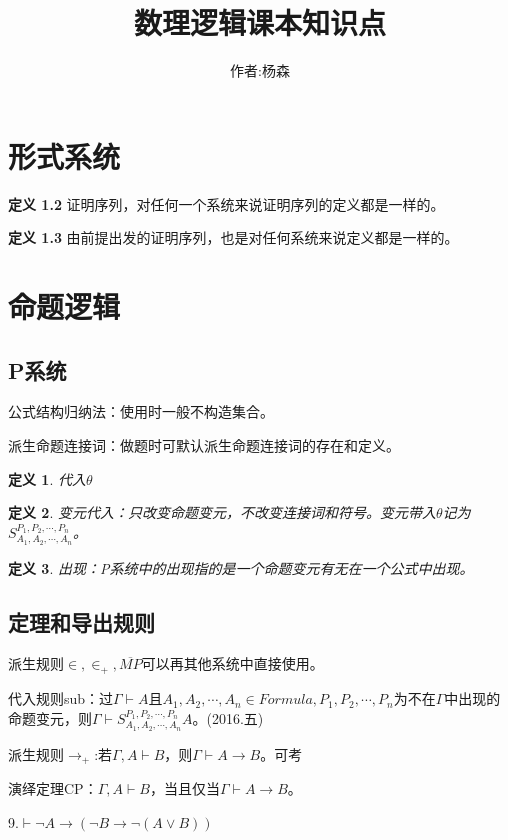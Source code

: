 \documentclass[a4paper]{ctexart}
\newtheorem{defi}{\hspace{2em}定义}[subsection]
\begin{document}
\title{数理逻辑课本知识点}
\author{作者:杨森}
\maketitle
\newpage

\section{形式系统}

\textbf{定义 1.2} 证明序列，对任何一个系统来说证明序列的定义都是一样的。

\textbf{定义 1.3} 由前提出发的证明序列，也是对任何系统来说定义都是一样的。 

\section{命题逻辑}
\subsection{P系统}
公式结构归纳法：使用时一般不构造集合。

派生命题连接词：做题时可默认派生命题连接词的存在和定义。
\begin{defi}
  代入$\theta$
\end{defi}
\begin{defi}
  变元代入：只改变命题变元，不改变连接词和符号。变元带入$\theta$记为$S_{A_1,A_2,\cdots,A_n}^{P_1,P_2,\cdots,P_n}$。
\end{defi}
\begin{defi}
  出现：P系统中的出现指的是一个命题变元有无在一个公式中出现。
\end{defi}

\subsection{定理和导出规则}
派生规则$\in,\in_{+},\overline{MP}$可以再其他系统中直接使用。

代入规则sub：过$\Gamma\vdash A$且$A_1,A_2,\cdots,A_n\in Formula,P_1,P_2,\cdots,P_n$为不在$\Gamma$中出现的命题变元，则$\Gamma\vdash S_{A_1,A_2,\cdots,A_n}^{P_1,P_2,\cdots,P_n}A $。(2016.五)

派生规则$\rightarrow_+$:若$\Gamma,A\vdash B$，则$\Gamma\vdash A\rightarrow B$。\colorbox{shadecolor}{可考}

演绎定理CP：$\Gamma,A\vdash B$，当且仅当$\Gamma\vdash A\rightarrow B$。

9.$\vdash\neg A\rightarrow(\neg B\rightarrow \neg(A\vee B))$
\end{document}
